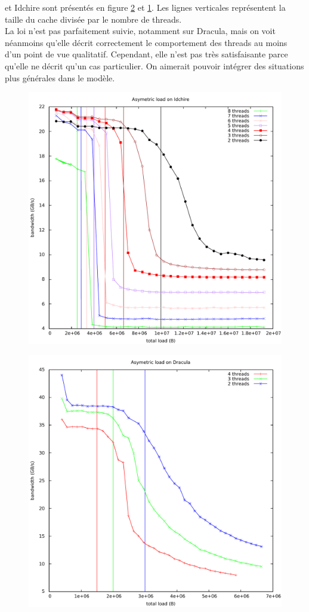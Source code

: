 \documentclass{report}
\begin{document}
et Idchire sont présentés en figure \ref{fig:dracasbench} et \ref{fig:idchasbench}. Les
lignes verticales représentent la taille du cache divisée par le nombre de threads.
\\La loi n'est pas parfaitement suivie, notamment sur Dracula, mais on voit néanmoins qu'elle
décrit correctement le comportement des threads au moins d'un point de vue qualitatif. Cependant,
elle n'est pas très satisfaisante parce qu'elle ne décrit qu'un cas particulier. On aimerait
pouvoir intégrer des situations plus générales dans le modèle.
\begin{figure}[H]
  \includegraphics[width=\linewidth]{bw-asym-idchire.pdf}
  \label{fig:idchasbench}
\end{figure}
\begin{figure}[H]
  \includegraphics[width=\linewidth]{bench-asym-dracula.pdf}
  \label{fig:dracasbench}
\end{figure}
\end{document}
